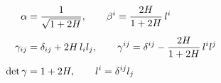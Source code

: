 \documentclass[preview]{standalone}
\begin{document}
\begin{align*}
\special{dvisvgm:raw <g id='unique000'>}\begin{aligned}
            \alpha &= \frac{1}{\sqrt{1+2H}}, \qquad \beta^i = \frac{2H}{1+2H}\,l^i\\[4pt]
            \gamma_{ij} &= \delta_{ij} + 2H\,l_il_j,\qquad \gamma^{ij} = \delta^{ij} - \frac{2H}{1+2H}\,l^il^j\\[4pt]
            \det\gamma &= 1+2H,\qquad l^i = \delta^{ij}l_j
            \end{aligned}\special{dvisvgm:raw </g>}
\end{align*}
\end{document}

